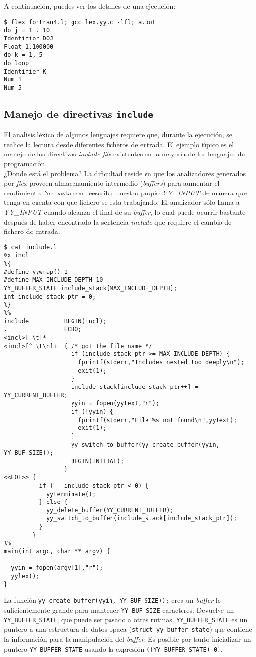 A continuación, puedes ver los detalles de una ejecución:
\begin{verbatim}
$ flex fortran4.l; gcc lex.yy.c -lfl; a.out
do j = 1 . 10
Identifier DOJ
Float 1.100000
do k = 1, 5
do loop
Identifier K
Num 1
Num 5                           
\end{verbatim}

\subsection{Manejo de directivas {\tt include}}
\label{section:include}
El analisis l\'exico de algunos lenguajes requiere que, durante la
ejecuci\'on, se realice la lectura desde
di\-fe\-ren\-tes ficheros de entrada. El ejemplo t\'{\i}pico es el manejo de las
directivas \emph{include file} existentes en la mayor\'{\i}a de los lenguajes de
programaci\'on.\\
¿Donde est\'a el problema? La dificultad reside en que los
analizadores generados por \emph{flex}
proveen almacenamiento intermedio (\emph{buffers}) para aumentar el
rendimiento. No basta con reescribir nuestro propio \emph{YY\_INPUT} de
manera que tenga en cuenta con que fichero se esta trabajando. 
El analizador s\'olo llama a \emph{YY\_INPUT} cuando alcanza el final de su
\emph{buffer}, lo cual puede ocurrir bastante despu\'es de haber
encontrado la sentencia \emph{include} que requiere el cambio de
fichero de entrada.
\begin{verbatim}
$ cat include.l
%x incl
%{
#define yywrap() 1
#define MAX_INCLUDE_DEPTH 10
YY_BUFFER_STATE include_stack[MAX_INCLUDE_DEPTH];
int include_stack_ptr = 0;
%}
%%
include          BEGIN(incl);
.                ECHO;
<incl>[ \t]*
<incl>[^ \t\n]+  { /* got the file name */
                   if (include_stack_ptr >= MAX_INCLUDE_DEPTH) {
                     fprintf(stderr,"Includes nested too deeply\n");
                     exit(1);
                   }
                   include_stack[include_stack_ptr++] = YY_CURRENT_BUFFER;
                   yyin = fopen(yytext,"r");
                   if (!yyin) {
                     fprintf(stderr,"File %s not found\n",yytext);
                     exit(1);
                   }
                   yy_switch_to_buffer(yy_create_buffer(yyin, YY_BUF_SIZE));
                   BEGIN(INITIAL);
                 }
<<EOF>> {
          if ( --include_stack_ptr < 0) {
            yyterminate();
          } else {
            yy_delete_buffer(YY_CURRENT_BUFFER);
            yy_switch_to_buffer(include_stack[include_stack_ptr]);
          }
        }
%%
main(int argc, char ** argv) {
 
  yyin = fopen(argv[1],"r");
  yylex();
}
\end{verbatim}
La funci\'on \verb|yy_create_buffer(yyin, YY_BUF_SIZE));| crea  un \emph{buffer}
lo suficientemente grande para mantener \verb|YY_BUF_SIZE| caracteres. Devuelve un 
\verb|YY_BUFFER_STATE|, que puede ser pasado a otras rutinas. \verb|YY_BUFFER_STATE| es un puntero a
una estructura de datos opaca (\verb|struct yy_buffer_state|) que contiene la informaci\'on para la manipulaci\'on
del \emph{buffer}. Es posible por tanto inicializar un puntero \verb|YY_BUFFER_STATE|
usando la expresión \verb|((YY_BUFFER_STATE) 0)|.

